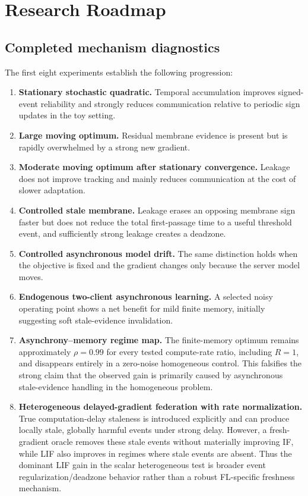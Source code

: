 \section{Research Roadmap}

\subsection{Completed mechanism diagnostics}

The first eight experiments establish the following progression:
\begin{enumerate}
  \item \textbf{Stationary stochastic quadratic.} Temporal accumulation improves signed-event reliability and strongly reduces communication relative to periodic sign updates in the toy setting.
  \item \textbf{Large moving optimum.} Residual membrane evidence is present but is rapidly overwhelmed by a strong new gradient.
  \item \textbf{Moderate moving optimum after stationary convergence.} Leakage does not improve tracking and mainly reduces communication at the cost of slower adaptation.
  \item \textbf{Controlled stale membrane.} Leakage erases an opposing membrane sign faster but does not reduce the total first-passage time to a useful threshold event, and sufficiently strong leakage creates a deadzone.
  \item \textbf{Controlled asynchronous model drift.} The same distinction holds when the objective is fixed and the gradient changes only because the server model moves.
  \item \textbf{Endogenous two-client asynchronous learning.} A selected noisy operating point shows a net benefit for mild finite memory, initially suggesting soft stale-evidence invalidation.
  \item \textbf{Asynchrony--memory regime map.} The finite-memory optimum remains approximately $\rho=0.99$ for every tested compute-rate ratio, including $R=1$, and disappears entirely in a zero-noise homogeneous control. This falsifies the strong claim that the observed gain is primarily caused by asynchronous stale-evidence handling in the homogeneous problem.
  \item \textbf{Heterogeneous delayed-gradient federation with rate normalization.} True computation-delay staleness is introduced explicitly and can produce locally stale, globally harmful events under strong delay. However, a fresh-gradient oracle removes these stale events without materially improving IF, while LIF also improves in regimes where stale events are absent. Thus the dominant LIF gain in the scalar heterogeneous test is broader event regularization/deadzone behavior rather than a robust FL-specific freshness mechanism.
\end{enumerate}

